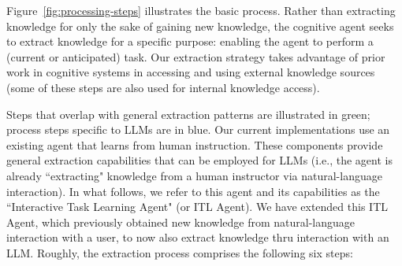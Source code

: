 \documentclass[letterpaper]{article} %
\begin{document}
Figure~\ref{fig:processing-steps} illustrates the basic process. Rather than extracting knowledge for only the sake of gaining new knowledge, the cognitive agent seeks to extract knowledge for a specific purpose: enabling the agent to perform a (current or anticipated) task. Our extraction strategy takes advantage of prior work in cognitive systems in accessing and using external knowledge sources (some of these steps are also used for internal knowledge access).

Steps that overlap with general extraction patterns are illustrated in green; process steps specific to LLMs are in blue. Our current implementations use an existing agent \cite{kirk_learning_2019,mininger_expanding_2021} that learns from human instruction. These components provide general extraction capabilities that can be employed for LLMs (i.e., the agent is already ``extracting" knowledge from a human instructor via natural-language interaction). In what follows, we refer to this agent and its capabilities as the ``Interactive Task Learning Agent" (or ITL Agent). We have extended this ITL Agent, which previously obtained new knowledge from natural-language interaction with a user, to now also extract knowledge thru interaction with an LLM. Roughly, the extraction process comprises the following six steps:

%
%
\end{document}
